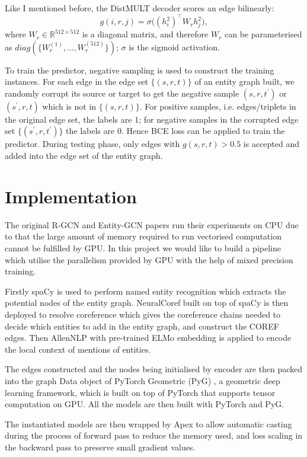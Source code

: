 \documentclass[12pt]{report}
\begin{document}
Like I mentioned before, the DistMULT decoder scores an edge bilinearly:
\[g(i,r,j)=\sigma\big((h_i^2)^\top W_rh_j^2\big),\]
where $W_r \in\mathbb{R}^{512\times512}$ is a diagonal matrix, 
and therefore $W_r$ can be parameterised as $diag(\{W_r^{(1)},\dots,W_r^{(512)}\})$; $\sigma$ is the sigmoid activation.

To train the predictor, negative sampling is used to construct the training instances. For each edge in the edge set $\{(s,r,t)\}$ of an entity graph built, we randomly corrupt its source or target to get the negative sample $(s,r,t^\prime)$ or $(s^\prime,r,t)$ which is not in $\{(s,r,t)\}$. For positive samples, i.e. edges/triplets in the original edge set, the labels are 1; for negative samples in the corrupted edge set $\{(s^\prime,r,t^\prime)\}$ the labels are 0.
Hence BCE loss can be applied to train the predictor. During testing phase, only edges with $g(s,r,t)>0.5$ is accepted and added into the edge set of the entity graph.

\section{Implementation}
The original R-GCN and Entity-GCN papers run their experiments on CPU due to that the large amount of memory required to run vectorised computation cannot be fulfilled by GPU. In this project we would like to build a pipeline which utilise the parallelism provided by GPU with the help of mixed precision training.

Firstly spaCy is used to perform named entity recognition which extracts the potential nodes of the entity graph. NeuralCoref built on top of spaCy is then deployed to resolve coreference which gives the coreference chains needed to decide which entities to add in the entity graph, and construct the COREF edges. Then AllenNLP \cite{gardner_allennlp:_2018} with pre-trained ELMo embedding is applied to encode the local context of mentions of entities.

 The edges constructed and the nodes being initialised by encoder are then packed into the graph Data object of PyTorch Geometric (PyG) \cite{fey_fast_2019}, a geometric deep learning framework, which is built on top of PyTorch \cite{paszke_automatic_2017} that supports tensor computation on GPU. All the models are then built with PyTorch and PyG.

The instantiated models are then wrapped by Apex \cite{micikevicius_mixed_2017} to allow automatic casting during the process of forward pass to reduce the memory used, and loss scaling in the backward pass to preserve small gradient values.
\end{document}
